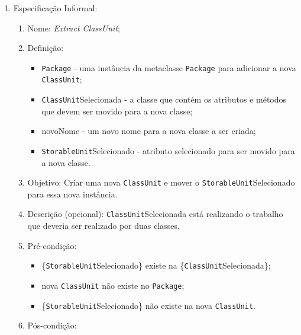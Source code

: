 \begin{enumerate}
	\item Especificação Informal:
		\begin{enumerate}
			\item Nome: \textit{Extract ClassUnit};
			\item Definição:
			    \begin{itemize}
			        \item \texttt{Package} - uma instância da metaclasse \texttt{Package} para adicionar a nova \texttt{ClassUnit};
			        \item \texttt{ClassUnit}Selecionada - a classe que contém os atributos e métodos que devem ser movido para a nova classe;
			        \item novoNome - um novo nome para a nova classe a ser criada;
			        \item \texttt{StorableUnit}Selecionado - atributo selecionado para ser movido para a nova classe.
			    \end{itemize}
			\item Objetivo: Criar uma nova \texttt{ClassUnit} e mover o \texttt{StorableUnit}Selecionado para essa nova instância.
			\item Descrição (opcional): \texttt{ClassUnit}Selecionada está realizando o trabalho que deveria ser realizado por duas classes.
			\item Pré-condição:
			    \begin{itemize}
			        \item \{\texttt{StorableUnit}Selecionado\} existe na \{\texttt{ClassUnit}Selecionada\};
			        \item nova \texttt{ClassUnit} não existe no \texttt{Package};
			        \item \{\texttt{StorableUnit}Selecionado\} não existe na nova \texttt{ClassUnit}.
			    \end{itemize}
			\item Pós-condição:
			    \begin{itemize}
			        

\end{itemize}
\end{enumerate}
\end{enumerate}
